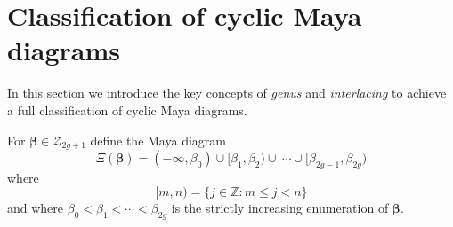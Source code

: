 \documentclass[10pt]{amsart}
\newtheorem{prop}[thm]{Proposition}
\theoremstyle{definition}
\newtheorem{definition}[thm]{Definition}
\numberwithin{equation}{section}
\numberwithin{figure}{section}
\newcommand{\Z}{\mathbb{Z}}
\newcommand{\bbeta}{{\boldsymbol{\beta}}}
\newcommand{\cZ}{\mathcal{Z}}
\begin{document}
\section{Classification of cyclic Maya diagrams}\label{sec:Mayacycles}

In this section we introduce the key concepts of \textit{genus} and
\textit{interlacing} to achieve a full classification of cyclic Maya
diagrams.





For $\bbeta\in \cZ_{2g+1}$ define the Maya diagram
\begin{equation}
  \label{eq:MBi}
  \Xi(\bbeta)= (-\infty,\beta_0) \cup [\beta_1,\beta_2) \cup
  \ \cdots \cup [\beta_{2g-1},\beta_{2g})
\end{equation}
where
\[ [m,n) = \{ j\in \Z \colon m\leq j < n\}\]
and where $\beta_0<\beta_1<\cdots < \beta_{2g}$ is the strictly increasing
enumeration of $\bbeta$.
\end{document}
